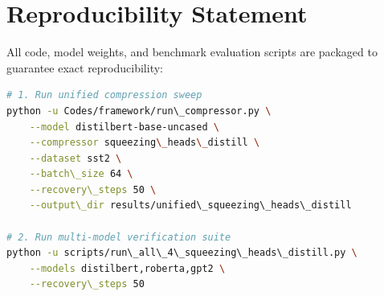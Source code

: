 \section{Reproducibility Statement}
All code, model weights, and benchmark evaluation scripts are packaged to guarantee exact reproducibility:
\begin{lstlisting}[language=bash]
# 1. Run unified compression sweep
python -u Codes/framework/run\_compressor.py \
    --model distilbert-base-uncased \
    --compressor squeezing\_heads\_distill \
    --dataset sst2 \
    --batch\_size 64 \
    --recovery\_steps 50 \
    --output\_dir results/unified\_squeezing\_heads\_distill

# 2. Run multi-model verification suite
python -u scripts/run\_all\_4\_squeezing\_heads\_distill.py \
    --models distilbert,roberta,gpt2 \
    --recovery\_steps 50
\end{lstlisting}
